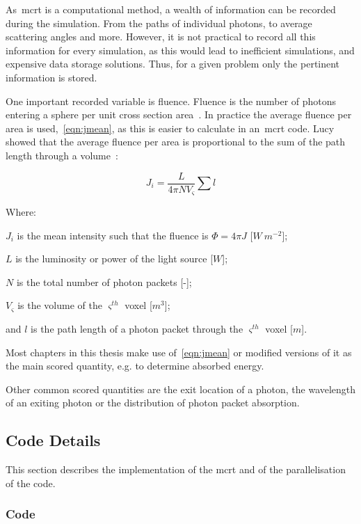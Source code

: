As~\gls*{mcrt} is a computational method, a wealth of information can be recorded during the simulation.
From the paths of individual photons, to average scattering angles and more.
However, it is not practical to record all this information for every simulation, as this would lead to inefficient simulations, and expensive data storage solutions.
Thus, for a given problem only the pertinent information is stored.

One important recorded variable is fluence.
Fluence is the number of photons entering a sphere per unit cross section area~\cite{rogers1990monte}.
In practice the average fluence per area is used,~\cref{eqn:jmean}, as this is easier to calculate in an~\gls*{mcrt} code.
Lucy showed that the average fluence per area is proportional to the sum of the path length through a volume~\cite{lucy1999computing}:

\begin{equation}
J_i = \frac{L}{4\pi NV_{\varsigma}}\sum l 
\label{eqn:jmean}
\end{equation}

\noindent Where:

\indent $J_i$ is the mean intensity such that the fluence is $\Phi=4\pi J$ [$W\ m^{-2}$];

\indent $L$ is the luminosity or power of the light source [$W$];

\indent $N$ is the total number of photon packets [-];

\indent $V_{\varsigma}$ is the volume of the $\varsigma^{th}$ voxel [$m^3$];

\indent and $l$ is the path length of a photon packet through the $\varsigma^{th}$ voxel [$m$]. 

\medskip

Most chapters in this thesis make use of~\cref{eqn:jmean} or modified versions of it as the main scored quantity, e.g. to determine absorbed energy.

Other common scored quantities are the exit location of a photon, the wavelength of an exiting photon or the distribution of photon packet absorption.

\subsection{Code Details}

This section describes the implementation of the \gls*{mcrt} and of the parallelisation of the code.

\subsubsection*{Code}

